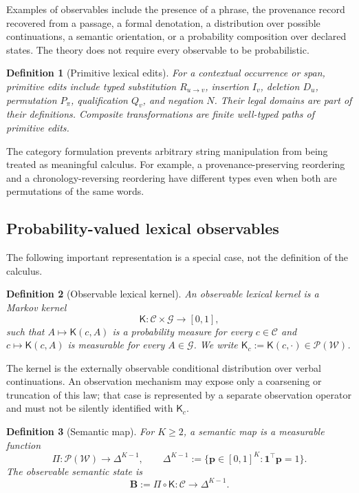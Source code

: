 \documentclass[11pt]{article}
\newtheorem{definition}{Definition}[section]
\newcommand{\Prob}{\mathcal P}
\newcommand{\Ctxt}{\mathcal C}
\newcommand{\Words}{\mathcal W}
\newcommand{\Bmap}{\mathbf B}
\newcommand{\Kern}{\mathsf K}
\begin{document}
Examples of observables include the presence of a phrase, the provenance record recovered from a passage, a formal denotation, a distribution over possible continuations, a semantic orientation, or a probability composition over declared states. The theory does not require every observable to be probabilistic.

\begin{definition}[Primitive lexical edits]
For a contextual occurrence or span, primitive edits include typed substitution $R_{u\to v}$, insertion $I_v$, deletion $D_u$, permutation $P_\pi$, qualification $Q_v$, and negation $N$. Their legal domains are part of their definitions. Composite transformations are finite well-typed paths of primitive edits.
\end{definition}

The category formulation prevents arbitrary string manipulation from being treated as meaningful calculus. For example, a provenance-preserving reordering and a chronology-reversing reordering have different types even when both are permutations of the same words.

\subsection{Probability-valued lexical observables}

The following important representation is a special case, not the definition of the calculus.

\begin{definition}[Observable lexical kernel]
An observable lexical kernel is a Markov kernel
\[
 \Kern:\Ctxt\times\mathcal G\longrightarrow[0,1],
\]
such that $A\mapsto\Kern(c,A)$ is a probability measure for every $c\in\Ctxt$ and $c\mapsto\Kern(c,A)$ is measurable for every $A\in\mathcal G$. We write $\Kern_c:=\Kern(c,\cdot)\in\Prob(\Words)$.
\end{definition}

The kernel is the externally observable conditional distribution over verbal continuations. An observation mechanism may expose only a coarsening or truncation of this law; that case is represented by a separate observation operator and must not be silently identified with $\Kern_c$.

\begin{definition}[Semantic map]
For $K\ge2$, a semantic map is a measurable function
\[
 \Pi:\Prob(\Words)\longrightarrow\Delta^{K-1},
 \qquad
 \Delta^{K-1}:=\{\bm p\in[0,1]^K:\bm 1^\top\bm p=1\}.
\]
The observable semantic state is
\[
 \Bmap:=\Pi\circ\Kern:\Ctxt\longrightarrow\Delta^{K-1}.
\]
\end{definition}
\end{document}
